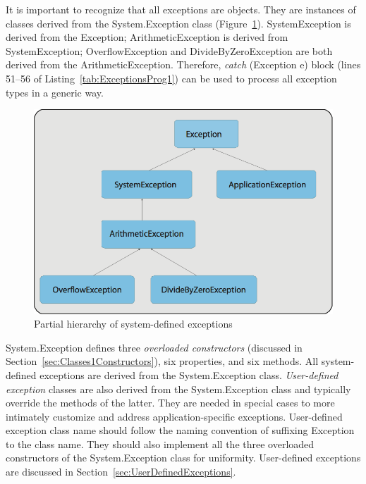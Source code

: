 It is important to recognize that all exceptions are objects. They
are instances of classes derived from the System.Exception class
(Figure~\ref{fig:ExceptionsTree}). SystemException is derived from
the Exception; ArithmeticException is derived from
SystemException; OverflowException and DivideByZeroException are
both derived from the ArithmeticException. Therefore, \emph{catch}
(Exception e) block (lines 51--56 of
Listing~\ref{tab:ExceptionsProg1}) can be used to process all
exception types in a generic way.


\begin{figure}
\centering
\includegraphics[scale=0.55]{./CSharpBasics/Illus/ExceptionsTree}
\caption{Partial hierarchy of system-defined exceptions}
\label{fig:ExceptionsTree}
\end{figure}

System.Exception defines three \emph{overloaded constructors}
(discussed in Section~\ref{sec:Classes1Constructors}), six
properties, and six methods. All system-defined exceptions are
derived from the System.Exception class. \emph{User-defined
exception} classes are also derived from the System.Exception
class and typically override the methods of the latter. They are
needed in special cases to more intimately customize and address
application-specific exceptions. User-defined exception class name
should follow the naming convention of suffixing Exception to the
class name. They should also implement all the three overloaded
constructors of the System.Exception class for uniformity.
User-defined exceptions are discussed in
Section~\ref{sec:UserDefinedExceptions}.


{\samepage\vspace{1ex}\noindent\usebox{\phicsep}\vspace{1.5ex}}
\vspace{-0.4in}
